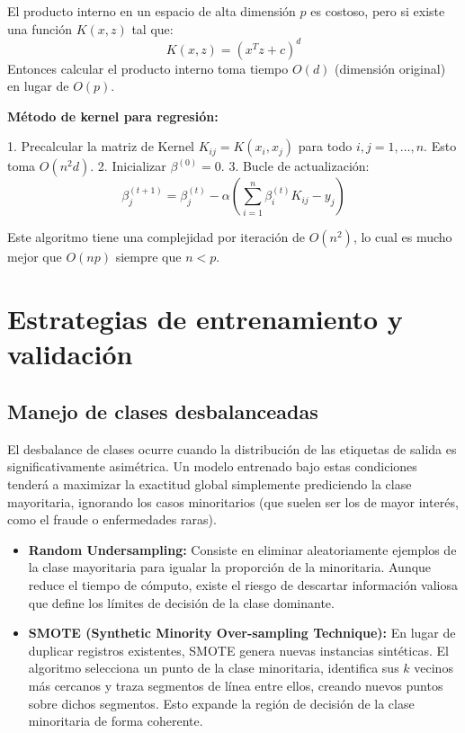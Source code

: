 El producto interno en un espacio de alta dimensión $p$ es costoso, pero si existe una función $K(x, z)$ tal que:
\[ K(x, z) = (x^T z + c)^d \]
Entonces calcular el producto interno toma tiempo $O(d)$ (dimensión original) en lugar de $O(p)$.

\textbf{Método de kernel para regresión:}

1. Precalcular la matriz de Kernel $K_{ij} = K(x_i, x_j)$ para todo $i, j = 1, \dots, n$. Esto toma $O(n^2 d)$.
2. Inicializar $\beta^{(0)} = 0$.
3. Bucle de actualización:
\[ \beta_j^{(t+1)} = \beta_j^{(t)} - \alpha \left( \sum_{i=1}^n \beta_i^{(t)} K_{ij} - y_j \right) \]

Este algoritmo tiene una complejidad por iteración de $O(n^2)$, lo cual es mucho mejor que $O(np)$ siempre que $n < p$.


\section{Estrategias de entrenamiento y validación}

\subsection{Manejo de clases desbalanceadas}
El desbalance de clases ocurre cuando la distribución de las etiquetas de salida es significativamente asimétrica. Un modelo entrenado bajo estas condiciones tenderá a maximizar la exactitud global simplemente prediciendo la clase mayoritaria, ignorando los casos minoritarios (que suelen ser los de mayor interés, como el fraude o enfermedades raras).

\begin{itemize}
\item \textbf{Random Undersampling:} Consiste en eliminar aleatoriamente ejemplos de la clase mayoritaria para igualar la proporción de la minoritaria. Aunque reduce el tiempo de cómputo, existe el riesgo de descartar información valiosa que define los límites de decisión de la clase dominante.
\item \textbf{SMOTE (Synthetic Minority Over-sampling Technique):} En lugar de duplicar registros existentes, SMOTE genera nuevas instancias sintéticas. El algoritmo selecciona un punto de la clase minoritaria, identifica sus $k$ vecinos más cercanos y traza segmentos de línea entre ellos, creando nuevos puntos sobre dichos segmentos. Esto expande la región de decisión de la clase minoritaria de forma coherente.

\end{itemize}

